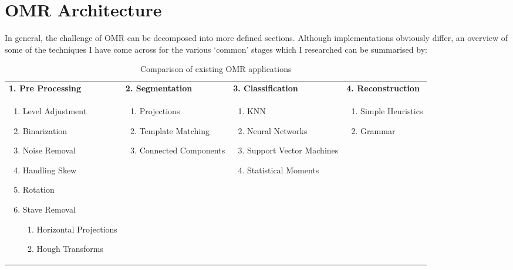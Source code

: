 \section{OMR Architecture}

In general, the challenge of OMR can be decomposed into more defined sections. Although implementations obviously differ, an overview of some of the techniques I have come across for the various `common' stages which I researched can be summarised by:

\begin{table}[h]
\small
\begin{tabularx}{\linewidth}{ X | X | X | X }
  \textbf{1. Pre Processing} & \textbf{2. Segmentation} & \textbf{3. Classification} &  \textbf{4. Reconstruction} \\

  \begin{enumerate}[leftmargin=*]
    \item Level Adjustment
    \item Binarization
    \item Noise Removal
    \item Handling Skew
    \item Rotation
    \item Stave Removal
      \begin{enumerate}
        \item Horizontal Projections
        \item Hough Transforms
      \end{enumerate}
  \end{enumerate}

  &

  \begin{enumerate}[leftmargin=*]
    \item Projections
    \item Template Matching
    \item Connected Components
  \end{enumerate}
  
  &

  \begin{enumerate}[leftmargin=*]
    \item \acrfull{KNN}
    \item Neural Networks
    \item Support Vector Machines
    \item Statistical Moments
  \end{enumerate}

  &

  \begin{enumerate}[leftmargin=*]
    \item Simple Heuristics
    \item Grammar
  \end{enumerate}
\end{tabularx}
\caption{Comparison of existing OMR applications}
\end{table}
